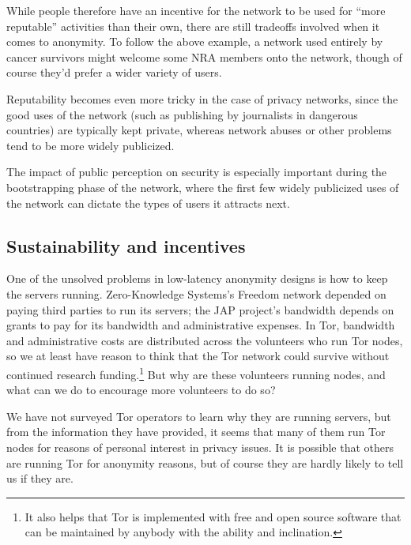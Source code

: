 \documentclass{llncs}
\begin{document}
While people therefore have an incentive for the network to be used for
``more reputable'' activities than their own, there are still tradeoffs
involved when it comes to anonymity. To follow the above example, a
network used entirely by cancer survivors might welcome some NRA members
onto the network, though of course they'd prefer a wider
variety of users.

Reputability becomes even more tricky in the case of privacy networks,
since the good uses of the network (such as publishing by journalists in
dangerous countries) are typically kept private, whereas network abuses
or other problems tend to be more widely publicized.

The impact of public perception on security is especially important
during the bootstrapping phase of the network, where the first few
widely publicized uses of the network can dictate the types of users it
attracts next.


\subsection{Sustainability and incentives}
One of the unsolved problems in low-latency anonymity designs is
how to keep the servers running.  Zero-Knowledge Systems's Freedom network
depended on paying third parties to run its servers; the JAP project's
bandwidth depends on grants to pay for its bandwidth and
administrative expenses.  In Tor, bandwidth and administrative costs are
distributed across the volunteers who run Tor nodes, so we at least have
reason to think that the Tor network could survive without continued research
funding.\footnote{It also helps that Tor is implemented with free and open
  source software that can be maintained by anybody with the ability and
  inclination.}  But why are these volunteers running nodes, and what can we
do to encourage more volunteers to do so?

We have not surveyed Tor operators to learn why they are running servers, but
from the information they have provided, it seems that many of them run Tor
nodes for reasons of personal interest in privacy issues.  It is possible
that others are running Tor for anonymity reasons, but of course they are
hardly likely to tell us if they are.
\end{document}
